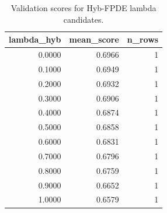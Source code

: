 \begin{table}[t]
\caption{Validation scores for Hyb-FPDE lambda candidates.}
\label{tab:lambda_distribution_computed}
\centering
\begin{tabular}{rrr}
\toprule
lambda\_hyb & mean\_score & n\_rows \\
\midrule
0.0000 & 0.6966 & 1 \\
0.1000 & 0.6949 & 1 \\
0.2000 & 0.6932 & 1 \\
0.3000 & 0.6906 & 1 \\
0.4000 & 0.6874 & 1 \\
0.5000 & 0.6858 & 1 \\
0.6000 & 0.6831 & 1 \\
0.7000 & 0.6796 & 1 \\
0.8000 & 0.6759 & 1 \\
0.9000 & 0.6652 & 1 \\
1.0000 & 0.6579 & 1 \\
\bottomrule
\end{tabular}

\end{table}
